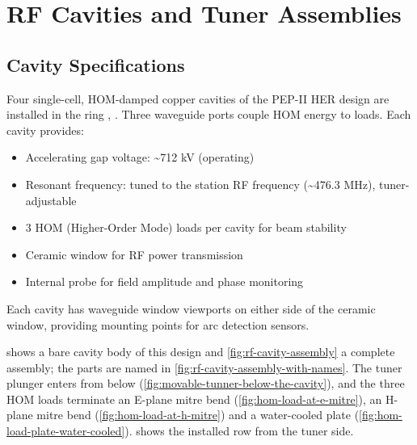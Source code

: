 


\section{RF Cavities and Tuner Assemblies}\label{sec:cavities}

\subsection{Cavity Specifications}\label{sec:cavity-specs}

Four single-cell, HOM-damped copper cavities of the PEP-II HER design are installed in the ring , . Three waveguide ports couple HOM energy to loads. Each cavity provides:

\begin{itemize}
\tightlist
\item
  Accelerating gap voltage: \textasciitilde712 kV (operating)
\item
  Resonant frequency: tuned to the station RF frequency (\textasciitilde476.3 MHz), tuner-adjustable
\item
  3 HOM (Higher-Order Mode) loads per cavity for beam stability
\item
  Ceramic window for RF power transmission
\item
  Internal probe for field amplitude and phase monitoring
\end{itemize}

Each cavity has waveguide window viewports on either side of the ceramic window, providing mounting points for arc detection sensors.

 shows a bare cavity body of this design and \cref{fig:rf-cavity-assembly} a complete assembly; the parts are named in \cref{fig:rf-cavity-assembly-with-names}. The tuner plunger enters from below (\cref{fig:movable-tunner-below-the-cavity}), and the three HOM loads terminate an E-plane mitre bend (\cref{fig:hom-load-at-e-mitre}), an H-plane mitre bend (\cref{fig:hom-load-at-h-mitre}) and a water-cooled plate (\cref{fig:hom-load-plate-water-cooled}).  shows the installed row from the tuner side.

